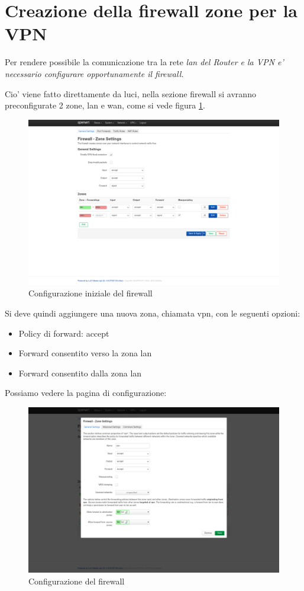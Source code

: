 \section{Creazione della firewall zone per la VPN} 

Per rendere possibile la comunicazione tra la rete \it{lan} del \it{Router} e la VPN e' necessario configurare opportunamente il firewall.

Cio' viene fatto direttamente da luci, nella sezione firewall si avranno preconfigurate 2 zone, lan e wan, come si vede figura \ref{fig:luci-firewall-init}.

\begin{figure}[H]
    \centering
    \includegraphics[width=0.9\linewidth]{immagini/LuCI_firewall_init}
    \caption{Configurazione iniziale del firewall}
    \label{fig:luci-firewall-init}
\end{figure}

Si deve quindi aggiungere una nuova zona, chiamata vpn, con le seguenti opzioni:
\begin{itemize}
    \item Policy di forward: accept
    \item Forward consentito verso la zona lan
    \item Forward consentito dalla zona lan
\end{itemize}

Possiamo vedere la pagina di configurazione:

\begin{figure}[H]
    \centering
    \includegraphics[width=0.9\linewidth]{immagini/LuCI_firewall_vpn}
    \caption{Configurazione del firewall}
    \label{fig:luci-firewall-vpn}
\end{figure}

